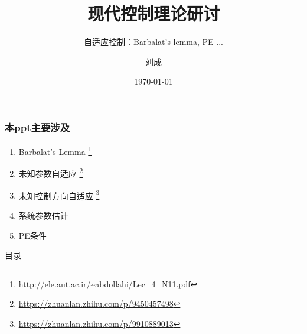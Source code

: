 \documentclass{beamer}
\title{现代控制理论研讨}
\subtitle{自适应控制：Barbalat's lemma, PE ...}
\author{刘成}
\institute{中山大学 航空航天学院}
\date{\today}
\begin{document}
\begin{frame}
  \titlepage
\end{frame}

\begin{frame}
  \frametitle{本ppt主要涉及}
  \begin{enumerate}
    \item Barbalat's Lemma \footnote{\url{http://ele.aut.ac.ir/~abdollahi/Lec_4_N11.pdf}}
    \item 未知参数自适应 \footnote{\url{https://zhuanlan.zhihu.com/p/9450457498}}
    \item 未知控制方向自适应 \footnote{\url{https://zhuanlan.zhihu.com/p/9910889013}}
    \item 系统参数估计
    \item PE条件 
  \end{enumerate}
\end{frame}

\begin{frame}{目录}
  \tableofcontents[sectionstyle=show/shaded, subsectionstyle=show/show/shaded]
\end{frame}



\end{document}
